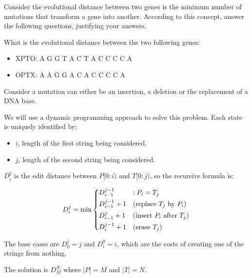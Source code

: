 {
Consider the evolutional distance between two genes is the minimum number of mutations that transform a gene into another. According to this concept, answer the following questions, justifying your answers.

What is the evolutional distance between the two following genes:
\begin{itemize}
    \item XPTO: A G G T A C T A C C C C A
    \item OPTX: A A G G A C A C C C C A
\end{itemize}

\ansseparator

Consider a mutation can either be an insertion, a deletion or the replacement of a DNA base.

We will use a dynamic programming approach to solve this problem. Each state is uniquely identified by:
\begin{itemize}
    \item $i$, length of the first string being considered.
    \item $j$, length of the second string being considered.
\end{itemize}

$D_i^j$ is the edit distance between $P[0:i)$ and $T[0:j)$, so the recursive formula is:

\begin{equation*}
    D_i^j = \min \begin{dcases}
        D_{i-1}^{j-1}   & : P_i = T_j \\
        D_{i-1}^{j-1}+1 & \text{(replace $T_j$ by $P_i$)} \\
        D_{i-1}^{j  }+1 & \text{(insert $P_i$ after $T_j$)} \\
        D_{i  }^{j-1}+1 & \text{(erase $T_j$)}
    \end{dcases}
\end{equation*}

The base cases are $D_0^j = j$ and $D_i^0 = i$, which are the costs of creating one of the strings from nothing.

The solution is $D_M^N$ where $|P|=M$ and $|T|=N$.

}
